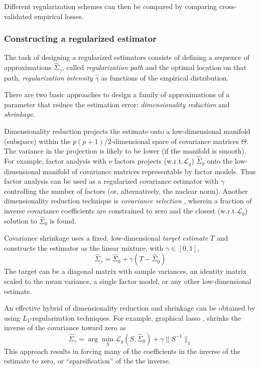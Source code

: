 Different regularization schemes can then be compared by comparing cross-validated empirical losses.

 
\subsubsection{Constructing a regularized estimator}
The task of designing a regularized estimators consists of defining a sequence of approximations $\hat\Sigma_\gamma$, called \emph{regularization path} and the optimal location on that path, \emph{regularization intensity} $\hat\gamma$ as  functions of the empirical distribution. 

There are two basic approaches to design a family of approximations of a parameter that reduce the estimation error: \emph{dimensionality reduction} and \emph{shrinkage}.  

Dimensionality reduction projects the estimate onto a low-dimensional manifold (subspace) within the $p(p+1)/2$-dimensional space of covariance matrices $\Theta$.  The variance in the projection is likely to be lower (if the manifold is smooth).  For example, factor analysis with $\nu$ factors projects (w.r.t.\;$\mathcal L_g$) $\hat\Sigma_0$ onto the low-dimensional manifold of covariance matrices representable by factor models. Thus factor analysis can be used as a regularized covariance estimator \citep{Fan:2008} with $\gamma$ controlling the number of factors (or, alternatively, the nuclear norm).  Another dimensionality reduction technique is \emph{covariance selection} \citep{Dempster:1972}, wherein a fraction of inverse covariance coefficients are constrained to zero and the closest (w.r.t.\;$\mathcal L_g$) solution to $\hat\Sigma_0$ is found. 

Covariance shrinkage \citep{Schafer:2005,Ledoit:2004} uses a fixed, low-dimensional \emph{target estimate} $T$ and constructs the estimator as the linear mixture, with $\gamma \in [0,1]$,
\begin{equation}
\hat\Sigma_\gamma = \hat\Sigma_0  + \gamma (T-\hat\Sigma_0) 
\end{equation}
 The target can be a diagonal matrix with sample variances, an identity matrix scaled to the mean variance, a single factor model, or any other low-dimensional estimate.

An effective hybrid of dimensionality reduction and shrinkage can be obtained by using $L_1$-regularization techniques.  For example, graphical lasso \citep{Meinshausen:2006,Friedman:2008}, shrinks the inverse of the covariance toward zero as 
\begin{equation}
\hat\Sigma_\gamma = \arg\min\limits_S \mathcal L_g(S,\hat \Sigma_0) + \gamma \| S^{-1} \|_1
\end{equation}
This approach results in forcing many of the coefficients in the inverse of the estimate to zero, or ``sparsification'' of the the inverse.

